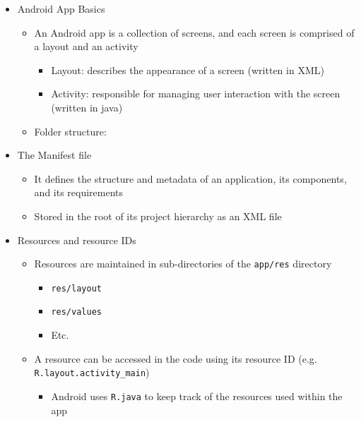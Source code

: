 \documentclass[11pt]{article}
\begin{document}
\begin{itemize}
	\item Android App Basics
		\begin{itemize}
			\item An Android app is a collection of screens, and each screen is comprised of a layout and an activity
				\begin{itemize}
					\item Layout: describes the appearance of a screen (written in XML)
					\item Activity: responsible for managing user interaction with the screen (written in java)
				\end{itemize}
			\item Folder structure:
		\end{itemize}
	\item The Manifest file
		\begin{itemize}
			\item It defines the structure and metadata of an application, its components, and its requirements
			\item Stored in the root of its project hierarchy as an XML file
		\end{itemize}

	\item Resources and resource IDs
		\begin{itemize}
			\item Resources are maintained in sub-directories of the \Verb|app/res| directory
				\begin{itemize}
					\item \Verb|res/layout|
					\item \Verb|res/values|
					\item Etc.
				\end{itemize}
			\item A resource can be accessed in the code using its resource ID (e.g. \Verb|R.layout.activity_main|)
				\begin{itemize}
					\item Android uses \Verb|R.java| to keep track of the resources used within the app
				\end{itemize}
		\end{itemize}


\end{itemize}
\end{document}

